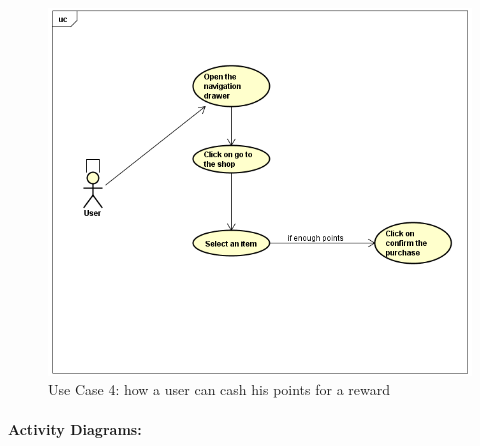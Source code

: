 \documentclass[paper=a4, fontsize=12pt,DIV=14]{scrartcl}    %
\begin{document}
		                \begin{figure}[!htbp]
		                    \center
		                    \includegraphics[scale=0.75]{img/shop.png}
		                    \caption{Use Case 4: how a user can cash his points for a reward}
		                \end{figure}

		                \paragraph{}

		                \paragraph{Activity Diagrams:}
        				\paragraph{}
\end{document}
